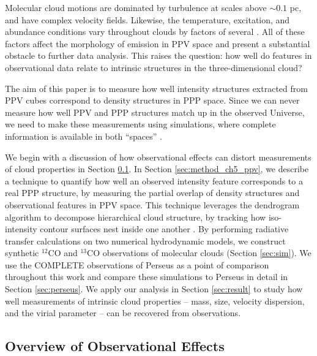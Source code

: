 Molecular cloud motions are dominated by turbulence at scales above $\sim 0.1$ pc, and have complex velocity fields. Likewise, the temperature, excitation, and abundance conditions vary throughout clouds by factors of several \citep{http://adsabs.harvard.edu/abs/2008ApJ...679..481P,  http://adsabs.harvard.edu/abs/2013ApJ...766L..17S} . All of these factors affect the morphology of emission in PPV space and present a substantial obstacle to further data analysis. This raises the question: how well do features in observational data relate to intrinsic structures in the three-dimensional cloud?


The aim of this paper is to measure how well intensity structures extracted from PPV cubes correspond to density structures in PPP space. Since we can never measure how well PPV and PPP structures match up in the observed Universe, we need to make these measurements using simulations, where complete information is available in both ``spaces'' \citep{http://adsabs.harvard.edu/abs/2011IAUS..270..511G}.

We begin with a discussion of how observational effects can distort measurements of cloud properties in Section \ref{sec:overview}. In Section \ref{sec:method_ch5_ppv}, we describe a technique to quantify how well an observed intensity feature corresponds to a real PPP structure, by measuring the partial overlap of density structures and observational features in PPV space. This technique leverages the dendrogram algorithm to decompose hierarchical cloud structure, by tracking how iso-intensity contour surfaces nest inside one another \citep{http://adsabs.harvard.edu/abs/2008ApJ...679.1338R}. By performing radiative transfer calculations on two numerical hydrodynamic models, we construct synthetic $^{12}$CO and $^{13}$CO observations of molecular clouds (Section \ref{sec:sim}). We use the COMPLETE observations of Perseus as a point of comparison throughout this work \citep{http://adsabs.harvard.edu/abs/2006AJ....131.2921R} and compare these simulations to Perseus in detail in Section \ref{sec:perseus}.
We apply our analysis in Section \ref{sec:result} to study how well measurements of intrinsic cloud properties --  mass, size, velocity dispersion, and the virial parameter -- can be recovered from observations.

\subsection{Overview of Observational Effects}
\label{sec:overview}

